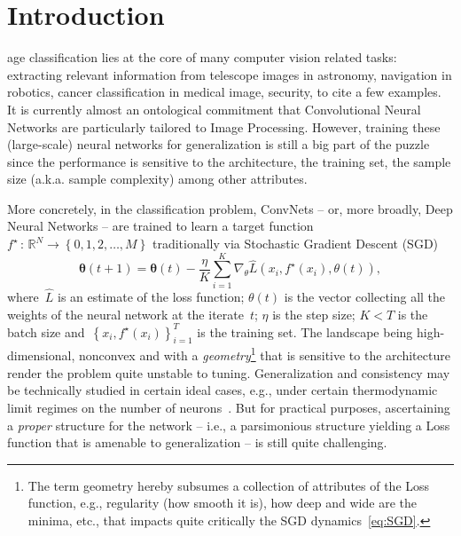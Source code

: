 \documentclass{ieeeaccess}
\begin{document}
\section{Introduction}
 age classification lies at the core of many computer vision related tasks: extracting relevant information from telescope images in astronomy, navigation in robotics, cancer classification in medical image, security, to cite a few examples. It is currently almost an ontological commitment that Convolutional Neural Networks are particularly tailored to Image Processing. However, training these (large-scale) neural networks for generalization is still a big part of the puzzle since the performance is sensitive to the architecture, the training set, the sample size (a.k.a. sample complexity) among other attributes.

More concretely, in the classification problem, ConvNets -- or, more broadly, Deep Neural Networks -- are trained to learn a target function $f^{\star}\,:\,\mathbb{R}^{N}\longrightarrow \left\{0,1,2,\ldots,M\right\}$ traditionally via Stochastic Gradient Descent (SGD)
\begin{equation}\label{eq:SGD}
\mathbf{\theta}(t+1)=\mathbf{\theta}(t)-\frac{\eta}{K}\sum\limits_{i=1}^K\nabla_{\theta}\widehat{L}\left(x_i,f^{\star}(x_i),\theta(t)\right),
\end{equation}
where~$\widehat{L}$ is an estimate of the loss function; $\theta(t)$ is the vector collecting all the weights of the neural network at the iterate~$t$; $\eta$ is the step size; $K<T$ is the batch size and~$\left\{x_i,f^{\star}(x_i)\right\}_{i=1}^T$ is the training set. The landscape being high-dimensional, nonconvex and with a \emph{geometry}\footnote{The term geometry hereby subsumes a collection of attributes of the Loss function, e.g., regularity (how smooth it is), how deep and wide are the minima, etc., that impacts quite critically the SGD dynamics~\eqref{eq:SGD}.} that is sensitive to the architecture render the problem quite unstable to tuning. Generalization and consistency may be technically studied in certain ideal cases, e.g., under certain thermodynamic limit regimes on the number of neurons~\cite{mei2018mean}. But for practical purposes, ascertaining a \emph{proper} structure for the network -- i.e., a parsimonious structure yielding a Loss function that is amenable to generalization -- is still quite challenging.
\end{document}
